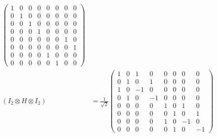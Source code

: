 \documentclass[10pt]{article}
\theoremstyle{definition}
\begin{document}
\begin{align*}
\begin{pmatrix}
                                                                                   1 & 0 & 0 & 0 & 0 & 0 & 0 & 0 \\
                                                                                   0 & 1 & 0 & 0 & 0 & 0 & 0 & 0 \\
                                                                                   0 & 0 & 1 & 0 & 0 & 0 & 0 & 0 \\
                                                                                   0 & 0 & 0 & 1 & 0 & 0 & 0 & 0 \\
                                                                                   0 & 0 & 0 & 0 & 0 & 0 & 1 & 0 \\
                                                                                   0 & 0 & 0 & 0 & 0 & 0 & 0 & 1 \\
                                                                                   0 & 0 & 0 & 0 & 1 & 0 & 0 & 0 \\
                                                                                   0 & 0 & 0 & 0 & 0 & 1 & 0 & 0
                                                                                 \end{pmatrix}                       \\
  (I_2 \otimes H \otimes I_2)                                                 & =\frac{1}{\sqrt{2}}\begin{pmatrix}
                                                                                                     1 & 0 & 1  & 0  & 0 & 0 & 0  & 0  \\
                                                                                                     0 & 1 & 0  & 1  & 0 & 0 & 0  & 0  \\
                                                                                                     1 & 0 & -1 & 0  & 0 & 0 & 0  & 0  \\
                                                                                                     0 & 1 & 0  & -1 & 0 & 0 & 0  & 0  \\
                                                                                                     0 & 0 & 0  & 0  & 1 & 0 & 1  & 0  \\
                                                                                                     0 & 0 & 0  & 0  & 0 & 1 & 0  & 1  \\
                                                                                                     0 & 0 & 0  & 0  & 1 & 0 & -1 & 0  \\
                                                                                                     0 & 0 & 0  & 0  & 0 & 1 & 0  & -1
                                                                                                   \end{pmatrix}
\end{align*}
\end{document}
